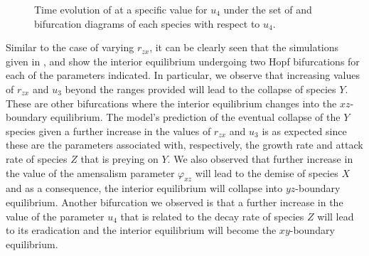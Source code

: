 \begin{figure}[H]
    \centering
    \hspace{5pt}
    \hspace{5pt}
    \hspace{5pt}
    \caption{Time evolution of  at a specific value for $u_4$ under the set of  and bifurcation diagrams of each species with respect to $u_4$.}
    \label{fig:bifurcation-u_4}
\end{figure}

Similar to the case of varying $r_{zx}$, it can be clearly seen that the simulations given in ,  and  show the interior equilibrium undergoing two Hopf bifurcations for each of the parameters indicated.
In particular, we observe that increasing values of $r_{zx}$ and $u_3$ beyond the ranges provided will lead to the collapse of species $Y$.
These are other bifurcations where the interior equilibrium changes into the $xz$-boundary equilibrium.
The model's prediction of the eventual collapse of the $Y$ species given a further increase in the values of $r_{zx}$ and $u_3$ is as expected since these are the parameters associated with, respectively,  the growth rate and attack rate of species $Z$ that is preying on $Y$.
We also observed that further increase in the value of the amensalism parameter $\varphi_{xz}$ will lead to the demise of species $X$ and  as a consequence, the interior equilibrium will collapse into $yz$-boundary equilibrium.
Another bifurcation we observed is that a further increase in the value of the parameter $u_4$ that is related to the decay rate of species $Z$ will lead to its eradication and the interior equilibrium will become the $xy$-boundary equilibrium.
